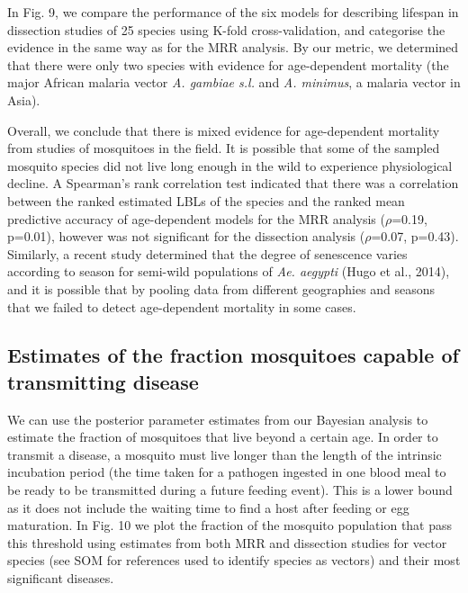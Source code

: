 \documentclass[]{article}
\begin{document}
In Fig. 9, we compare the performance of the six models for describing
lifespan in dissection studies of 25 species using K-fold
cross-validation, and categorise the evidence in the same way as for the
MRR analysis. By our metric, we determined that there were only two
species with evidence for age-dependent mortality (the major African
malaria vector \emph{A. gambiae s.l.} and \emph{A. minimus}, a malaria
vector in Asia).

Overall, we conclude that there is mixed evidence for age-dependent
mortality from studies of mosquitoes in the field. It is possible that
some of the sampled mosquito species did not live long enough in the
wild to experience physiological decline. A Spearman's rank correlation
test indicated that there was a correlation between the ranked estimated
LBLs of the species and the ranked mean predictive accuracy of
age-dependent models for the MRR analysis ($\rho$=0.19, p=0.01), however was
not significant for the dissection analysis ($\rho$=0.07, p=0.43). Similarly,
a recent study determined that the degree of senescence varies according
to season for semi-wild populations of \emph{Ae. aegypti} (Hugo et al.,
2014), and it is possible that by pooling data from different
geographies and seasons that we failed to detect age-dependent mortality
in some cases.

\subsection{Estimates of the fraction mosquitoes capable of transmitting
disease}\label{estimates-of-the-fraction-mosquitoes-capable-of-transmitting-disease}

We can use the posterior parameter estimates from our Bayesian analysis
to estimate the fraction of mosquitoes that live beyond a certain age.
In order to transmit a disease, a mosquito must live longer than the
length of the intrinsic incubation period (the time taken for a pathogen
ingested in one blood meal to be ready to be transmitted during a future
feeding event). This is a lower bound as it does not include the waiting
time to find a host after feeding or egg maturation. In Fig. 10 we plot
the fraction of the mosquito population that pass this threshold using
estimates from both MRR and dissection studies for vector species (see
SOM for references used to identify species as vectors) and their most
significant diseases.
\end{document}
